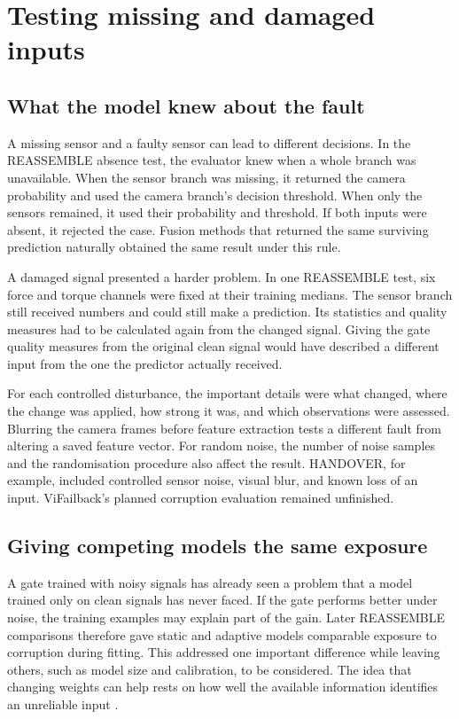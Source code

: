 \section{Testing missing and damaged inputs}
\label{sec:ch4-robustness}

\subsection{What the model knew about the fault}

A missing sensor and a faulty sensor can lead to different decisions. In the REASSEMBLE
absence test, the evaluator knew when a whole branch was unavailable. When the sensor
branch was missing, it returned the camera probability and used the camera branch’s
decision threshold. When only the sensors remained, it used their probability and
threshold. If both inputs were absent, it rejected the case. Fusion methods that
returned the same surviving prediction naturally obtained the same result under this
rule.

A damaged signal presented a harder problem. In one REASSEMBLE test, six force and
torque channels were fixed at their training medians. The sensor branch still received
numbers and could still make a prediction. Its statistics and quality measures had to be
calculated again from the changed signal. Giving the gate quality measures from the
original clean signal would have described a different input from the one the predictor
actually received.

For each controlled disturbance, the important details were what changed, where the
change was applied, how strong it was, and which observations were assessed. Blurring
the camera frames before feature extraction tests a different fault from altering a
saved feature vector. For random noise, the number of noise samples and the
randomisation procedure also affect the result. HANDOVER, for example, included
controlled sensor noise, visual blur, and known loss of an input. ViFailback’s planned
corruption evaluation remained unfinished.

\subsection{Giving competing models the same exposure}

A gate trained with noisy signals has already seen a problem that a model trained only
on clean signals has never faced. If the gate performs better under noise, the training
examples may explain part of the gain. Later REASSEMBLE comparisons therefore gave
static and adaptive models comparable exposure to corruption during fitting. This
addressed one important difference while leaving others, such as model size and
calibration, to be considered. The idea that changing weights can help rests on how well
the available information identifies an unreliable input \parencite{Zhang2023QMF}.

